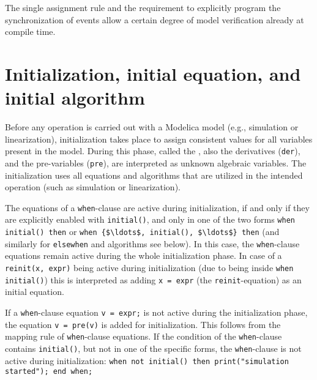 \begin{nonnormative}
The single assignment rule and the requirement to explicitly
program the synchronization of events allow a certain degree of model
verification already at compile time.
\end{nonnormative}


\section{Initialization, initial equation, and initial algorithm}\label{initialization-initial-equation-and-initial-algorithm}

Before any operation is carried out with a Modelica model (e.g., simulation or linearization), initialization takes place to assign consistent values for all variables present in the model.
During this phase, called the , also the derivatives (\lstinline!der!), and the pre-variables (\lstinline!pre!), are interpreted as unknown algebraic variables.
The initialization uses all equations and algorithms that are utilized in the intended operation (such as simulation or linearization).

The equations of a \lstinline!when!-clause are active during initialization, if and only if they are explicitly enabled with \lstinline!initial()!, and only in one of the two forms
\lstinline!when initial() then! or \lstinline!when {$\ldots$, initial(), $\ldots$} then! (and similarly for \lstinline!elsewhen! and algorithms see below).  In this case, the \lstinline!when!-clause equations remain active during the
whole initialization phase.  In case of a \lstinline!reinit(x, expr)! being active during initialization (due to being inside \lstinline!when initial()!) this is interpreted as adding
\lstinline!x = expr! (the \lstinline!reinit!-equation) as an initial equation.

\begin{nonnormative}
If a \lstinline!when!-clause equation \lstinline!v = expr;! is not active during the initialization phase, the equation \lstinline!v = pre(v)! is added for
initialization.  This follows from the mapping rule of \lstinline!when!-clause equations.  If the condition of the \lstinline!when!-clause contains \lstinline!initial()!,
but not in one of the specific forms, the \lstinline!when!-clause is not active during initialization: \lstinline!when not initial() then print("simulation started"); end when;!
\end{nonnormative}

